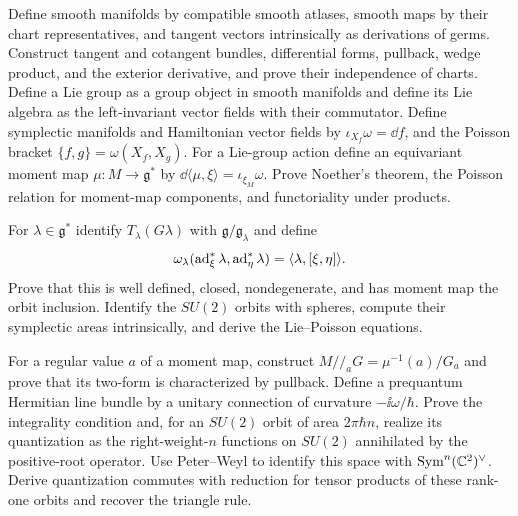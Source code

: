 \begin{exercise}
Define smooth manifolds by compatible smooth atlases, smooth maps by their
chart representatives, and tangent vectors intrinsically as derivations of
germs.  Construct tangent and cotangent bundles, differential forms, pullback,
wedge product, and the exterior derivative, and prove their independence of
charts.  Define a Lie group as a group object in smooth manifolds and define
its Lie algebra as the left-invariant vector fields with their commutator.
Define symplectic manifolds and
Hamiltonian vector fields by
$\iota_{X_f}\omega=\dd f$, and the Poisson bracket
$\{f,g\}=\omega(X_f,X_g)$.  For a Lie-group action define an equivariant
moment map $\mu:M\to\mathfrak g^*$ by
$\dd\langle\mu,\xi\rangle=\iota_{\xi_M}\omega$.  Prove Noether's theorem,
the Poisson relation for moment-map components, and functoriality under
products.
\end{exercise}

\begin{exercise}
For $\lambda\in\mathfrak g^*$ identify
$T_\lambda(G\lambda)$ with $\mathfrak g/\mathfrak g_\lambda$ and define
\[
 \omega_\lambda(\operatorname{ad}^*_\xi\lambda,\operatorname{ad}^*_\eta\lambda)
 =\langle\lambda,[\xi,\eta]\rangle.
\]
Prove that this is well defined, closed, nondegenerate, and has moment map the
orbit inclusion.  Identify the $SU(2)$ orbits with spheres, compute their
symplectic areas intrinsically, and derive the Lie--Poisson equations.
\end{exercise}

\begin{exercise}
For a regular value $a$ of a moment map, construct
$M//_aG=\mu^{-1}(a)/G_a$ and prove that its two-form is characterized by
pullback.  Define a prequantum Hermitian line bundle by a unitary connection
of curvature $-\ii\omega/\hbar$.  Prove the integrality condition and, for an
$SU(2)$ orbit of area $2\pi\hbar n$, realize its quantization as the
right-weight-$n$ functions on $SU(2)$ annihilated by the positive-root
operator.  Use Peter--Weyl to identify this space with
$\operatorname{Sym}^n(\mathbb C^2)^\vee$.
Derive quantization commutes with reduction for tensor products of these
rank-one orbits and recover the triangle rule.
\end{exercise}

